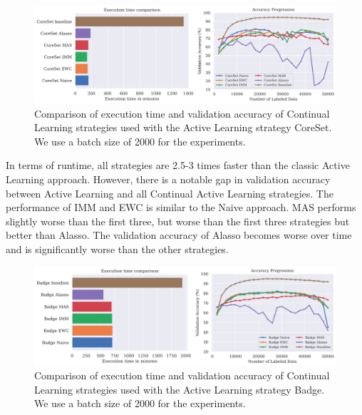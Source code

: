 \begin{figure}[h]
    \centering
    \includegraphics[width=\linewidth]{images/results_CAL/CoreSet_CAL_2000b.png}
    \caption[Continual Active Learning CoreSet 2000 batch size]{Comparison of execution time and validation accuracy of Continual Learning strategies used with the Active Learning strategy
    CoreSet. We use a batch size of 2000 for the experiments.}
    \label{fig:Evaluation:Results:CAL:CoreSet2000}
\end{figure}

In terms of runtime, all
    strategies are 2.5-3 times faster than the classic Active Learning approach. However, there is a notable gap in validation accuracy between Active Learning and all Continual
    Active Learning strategies. The performance of IMM and EWC is similar to the Naive approach. MAS performs slightly worse than the first three, but 
    worse than the first three strategies but better than Alasso. The validation accuracy of Alasso becomes worse over time and is significantly worse than the other strategies.

\begin{figure}[h]
    \centering
    \includegraphics[width=\linewidth]{images/results_CAL/Badge_CAL_2000b.png}
    \caption[Continual Active Learning Badge 2000 batch size]{Comparison of execution time and validation accuracy of Continual Learning strategies used with the Active Learning strategy
    Badge. We use a batch size of 2000 for the experiments.}
    \label{fig:Evaluation:Results:CAL:Badge2000}
\end{figure}


